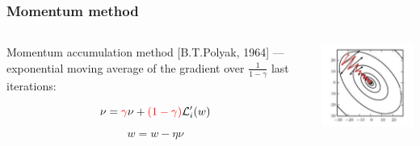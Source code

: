 \documentclass[fullscreen=true, bookmarks=true, hyperref={pdfencoding=unicode}]{beamer}
\begin{document}
\begin{frame}
\frametitle{Momentum method}

   \begin{columns}
     \begin{column}{0.45\paperwidth}
     Momentum accumulation method [B.T.Polyak, 1964] — exponential moving average of the gradient over $\frac{1}{1-\gamma}$ last iterations:

     $$\nu = {\color{red}\gamma} \nu + {\color{red}(1-\gamma)} \mathcal{L}_i^\prime(w)$$
     
     $$w = w - \eta \nu$$
     \end{column}
     \begin{column}{0.45\paperwidth}
     \centering
     \includegraphics[keepaspectratio,
                      width=0.3\paperwidth]{momentum_2.jpg}
     \end{column}
   \end{columns}


\end{frame}
\end{document}

